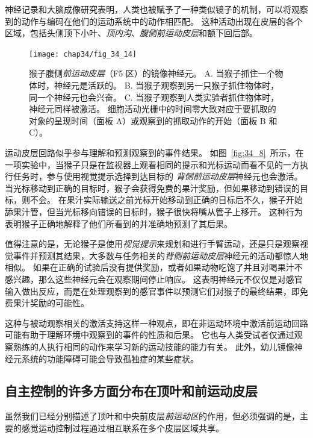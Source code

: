 神经记录和大脑成像研究表明，人类也被赋予了一种类似镜子的机制，可以将观察到的动作与编码在他们的运动系统中的动作相匹配。
这种活动出现在皮层的各个区域，包括头侧顶下小叶、\textit{顶内沟}、\textit{腹侧前运动皮层}和额下回后部。


\begin{figure}[htbp]
	\centering
	\texttt{[image: chap34/fig\_34\_14]}
	\caption{猴子腹侧\textit{前运动皮层}（F5 区）的镜像神经元\cite{rizzolatti1996premotor}。
		A. 当猴子抓住一个物体时，神经元是活跃的。
		B. 当猴子观察到另一只猴子抓住物体时，同一个神经元也会兴奋。
		C. 当猴子观察到人类实验者抓住物体时，神经元同样被激活。
		细胞活动光栅中的时间零大致对应于要抓取的对象的呈现时间（面板 A）或观察到的抓取动作的开始（面板 B 和 C）。}
	\label{fig:34_14}
\end{figure}


运动皮层回路似乎参与理解和预测观察到的事件结果。
如图~\ref{fig:34_8}~所示，在一项实验中，当猴子只是在监视器上观看相同的提示和光标运动而看不见的一方执行任务时，参与使用视觉提示选择到达目标的 \textit{背侧前运动皮层}神经元也会激活。
当光标移动到正确的目标时，猴子会获得免费的果汁奖励，但如果移动到错误的目标，则不会。
在果汁实际输送之前光标开始移动到正确的目标后不久，猴子开始舔果汁管，但当光标移向错误的目标时，猴子很快将嘴从管子上移开。
这种行为表明猴子正确地解释了他们所看到的并准确地预测了其后果。


值得注意的是，无论猴子是使用\textit{视觉提示}来规划和进行手臂运动，还是只是观察视觉事件并预测其结果，大多数与任务相关的\textit{背侧前运动皮层}神经元的活动都惊人地相似。
如果在正确的试验后没有提供奖励，或者如果动物吃饱了并且对喝果汁不感兴趣，那么这些神经元会在观察期间停止响应。
这表明神经元不仅仅是对感官输入做出反应，而是在处理观察到的感官事件以预测它们对猴子的最终结果，即免费果汁奖励的可能性。


这种与被动观察相关的激活支持这样一种观点，即在非运动环境中激活前运动回路可能有助于理解环境中观察到的事件的性质和后果。
它也与人类受试者仅通过观察熟练的人执行相同的动作来学习新的运动技能的能力有关。
此外，幼儿镜像神经元系统的功能障碍可能会导致孤独症的某些症状。



\subsection{自主控制的许多方面分布在顶叶和前运动皮层}

虽然我们已经分别描述了顶叶和中央前皮层\textit{前运动区}的作用，但必须强调的是，主要的感觉运动控制过程通过相互联系在多个皮层区域共享。


